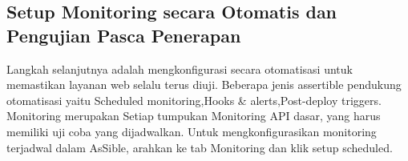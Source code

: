 \documentclass[12pt,a4paper]{article}
\begin{document}
\subsection{Setup Monitoring secara Otomatis dan Pengujian Pasca Penerapan}
Langkah selanjutnya adalah mengkonfigurasi secara otomatisasi untuk memastikan layanan web selalu terus diuji. 
Beberapa jenis assertible pendukung otomatisasi yaitu Scheduled monitoring,Hooks & alerts,Post-deploy triggers. Monitoring merupakan
Setiap tumpukan Monitoring API dasar, yang harus memiliki uji coba yang dijadwalkan. Untuk mengkonfigurasikan monitoring terjadwal dalam AsSible, arahkan ke tab Monitoring dan klik setup scheduled.
\end{document}
